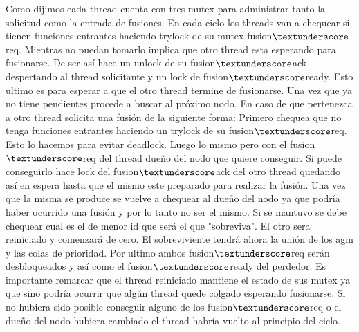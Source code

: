 Como dijimos cada thread cuenta con tres mutex para administrar tanto la solicitud como la entrada de fusiones. En cada ciclo los threads van a chequear si tienen funciones entrantes haciendo trylock de su mutex fusion$\textunderscore$req. Mientras no puedan tomarlo implica que otro thread esta esperando para fusionarse. De ser así hace un unlock de su fusion$\textunderscore$ack despertando al thread solicitante y un lock de fusion$\textunderscore$ready. Esto ultimo es para esperar a que el otro thread termine de fusionarse. Una vez que ya no tiene pendientes procede a buscar al próximo nodo. En caso de que pertenezca a otro thread solicita una fusión de la siguiente forma: Primero chequea que no tenga funciones entrantes haciendo un trylock de su fusion$\textunderscore$req. Esto lo hacemos para evitar deadlock. Luego lo mismo pero con el fusion$\textunderscore$req del thread dueño del nodo que quiere conseguir. Si puede conseguirlo hace lock del fusion$\textunderscore$ack del otro thread quedando así en espera hasta que el mismo este preparado para realizar la fusión. Una vez que la misma se produce se vuelve a chequear al dueño del nodo ya que podría haber ocurrido una fusión y por lo tanto no ser el mismo. Si se mantuvo se debe chequear cual es el de menor id que será el que "sobreviva". El otro sera reiniciado y comenzará de cero. El sobreviviente tendrá ahora la unión de los agm y las colas de prioridad. Por ultimo ambos fusion$\textunderscore$req serán desbloqueados y así como el fusion$\textunderscore$ready del perdedor. Es importante remarcar que el thread reiniciado mantiene el estado de sus mutex ya que sino podría ocurrir que algún thread quede colgado esperando fusionarse. Si no hubiera sido posible conseguir alguno de los fusion$\textunderscore$req o el dueño del nodo hubiera cambiado el thread habría vuelto al principio del ciclo.

